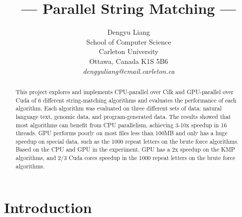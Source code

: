 \documentclass[11pt]{article}       %
\begin{document}


\title{--- Parallel String Matching ---}


\author{
Dengyu Liang\\
School of Computer Science\\
Carleton University\\
Ottawa, Canada K1S 5B6\\
{\em dengyuliang@cmail.carleton.ca}
} %

\maketitle

\begin{abstract}
This project explores and implements CPU-parallel over Cilk and GPU-parallel over Cuda of 6 different string-matching algorithms and evaluates the performance of each algorithm. Each algorithm was evaluated on three different sets of data: natural language text, genomic data, and program-generated data. The results showed that most algorithms can benefit from CPU parallelism, achieving 3-10x speedup in 16 threads. GPU performs poorly on most files less than 100MB and only has a huge speedup on special data, such as the 1000 repeat letters on the brute force algorithms.  Based on the CPU and GPU in the experiment, GPU has a 2x speedup on the KMP algorithms, and 2/3 Cuda cores speedup in the 1000 repeat letters on the brute force algorithms. 

\end{abstract}


\section{Introduction} \label{intro}
\end{document}
